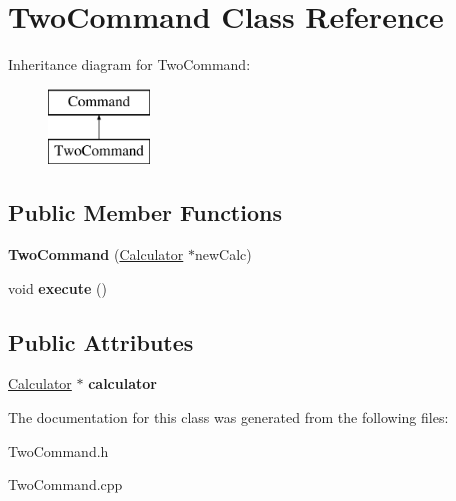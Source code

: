 \hypertarget{class_two_command}{}\section{Two\+Command Class Reference}
\label{class_two_command}
Inheritance diagram for Two\+Command\+:\begin{figure}[H]
\begin{center}
\leavevmode
\includegraphics[height=2.000000cm]{class_two_command}
\end{center}
\end{figure}
\subsection*{Public Member Functions}
\begin{DoxyCompactItemize}
\item 
\hypertarget{class_two_command_a73335d14fe98bc82ef181647b5541aea}{}{\bfseries Two\+Command} (\hyperlink{class_calculator}{Calculator} $\ast$new\+Calc)\label{class_two_command_a73335d14fe98bc82ef181647b5541aea}

\item 
\hypertarget{class_two_command_a5065cc2a07c69dcba178c82d7610e29f}{}void {\bfseries execute} ()\label{class_two_command_a5065cc2a07c69dcba178c82d7610e29f}

\end{DoxyCompactItemize}
\subsection*{Public Attributes}
\begin{DoxyCompactItemize}
\item 
\hypertarget{class_two_command_a0242384aa6f8091cc5c413d4e4763cf9}{}\hyperlink{class_calculator}{Calculator} $\ast$ {\bfseries calculator}\label{class_two_command_a0242384aa6f8091cc5c413d4e4763cf9}

\end{DoxyCompactItemize}


The documentation for this class was generated from the following files\+:\begin{DoxyCompactItemize}
\item 
Two\+Command.\+h\item 
Two\+Command.\+cpp\end{DoxyCompactItemize}

